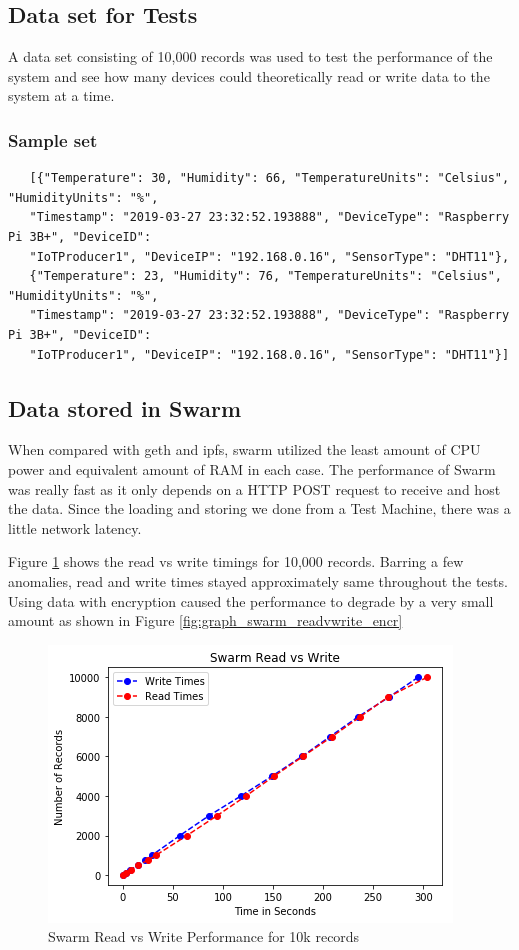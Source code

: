 \documentclass[11pt,openright]{report}
\begin{document}
\subsection{Data set for Tests}
A data set consisting of 10,000 records was used to test the performance of the system and see how many devices could theoretically read or write data to the system at a time.

\subsubsection{Sample set}
\begin{verbatim}
   [{"Temperature": 30, "Humidity": 66, "TemperatureUnits": "Celsius", "HumidityUnits": "%",
   "Timestamp": "2019-03-27 23:32:52.193888", "DeviceType": "Raspberry Pi 3B+", "DeviceID":
   "IoTProducer1", "DeviceIP": "192.168.0.16", "SensorType": "DHT11"}, 
   {"Temperature": 23, "Humidity": 76, "TemperatureUnits": "Celsius", "HumidityUnits": "%",
   "Timestamp": "2019-03-27 23:32:52.193888", "DeviceType": "Raspberry Pi 3B+", "DeviceID":
   "IoTProducer1", "DeviceIP": "192.168.0.16", "SensorType": "DHT11"}]
\end{verbatim}

\subsection{Data stored in Swarm}
When compared with geth and ipfs, swarm utilized the least amount of CPU power and equivalent amount of RAM in each case. The performance of Swarm was really fast as it only depends on a HTTP POST request to receive and host the data. Since the loading and storing we done from a Test Machine, there was a little network latency.

Figure \ref{fig:graph_swarm_readvwrite} shows the read vs write timings for 10,000 records. Barring a few anomalies, read and write times stayed approximately same throughout the tests.
Using data with encryption caused the performance to degrade by a very small amount as shown in Figure \ref{fig:graph_swarm_readvwrite_encr}

\begin{figure}
	\centering
	\includegraphics[scale=1]{results/SwarmRvW.png}
	\caption{Swarm Read vs Write Performance for 10k records}
	\label{fig:graph_swarm_readvwrite}
\end{figure}
\end{document}
